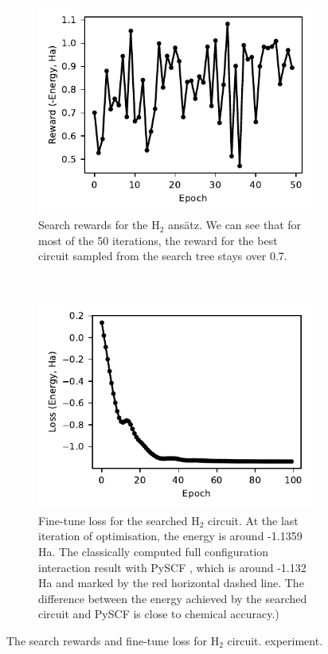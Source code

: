 \documentclass{ieeeaccess}
\begin{document}
\begin{figure}[t!]
    \centering
    \begin{subfigure}[t]{0.4\linewidth}
        \includegraphics[width=\linewidth]{peiyong_fig_9.pdf}
        \caption{Search rewards for the $\text{H}_2$ ans\"atz. We can see that for most of the 50 iterations, the reward for the best circuit sampled from the search tree stays over 0.7.}
        \label{fig:h2_search}
    \end{subfigure}
    ~ %
    \begin{subfigure}[t]{0.4\linewidth}
        \includegraphics[width=\linewidth]{peiyong_fig_10.pdf}
        \caption{Fine-tune loss for the searched $\text{H}_2$ circuit. At the last iteration of optimisation, the energy is around -1.1359 Ha. The classically computed full configuration interaction result with PySCF \cite{Sun2018-nq, Sun2020-ej}, which is around -1.132 Ha and marked by the red horizontal dashed line. The difference between the energy achieved by the searched circuit and PySCF is close to chemical accuracy.)}
        \label{fig:h2_finetune}
    \end{subfigure}
    \caption{The search rewards and fine-tune loss for $\text{H}_2$ circuit. experiment.}\label{fig:h2_search_finetune}
\end{figure}
\end{document}
